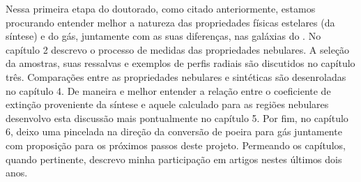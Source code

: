 Nessa primeira etapa do doutorado, como citado anteriormente, estamos procurando entender melhor a
natureza das propriedades físicas estelares (da síntese) e do gás, juntamente com as suas
diferenças, nas galáxias do \PCAL. No capítulo 2 descrevo o processo de medidas das propriedades
nebulares. A seleção da amostras, suas ressalvas e exemplos de perfis radiais são discutidos no
capítulo três. Comparações entre as propriedades nebulares e sintéticas são desenroladas no
capítulo 4. De maneira e melhor entender a relação entre o coeficiente de extinção proveniente da
síntese e aquele calculado para as regiões nebulares desenvolvo esta discussão mais pontualmente no
capítulo 5. Por fim, no capítulo 6, deixo uma pincelada na direção da conversão de poeira para gás
juntamente com proposição para os próximos passos deste projeto. Permeando os capítulos, quando
pertinente, descrevo minha participação em artigos nestes últimos dois anos.

